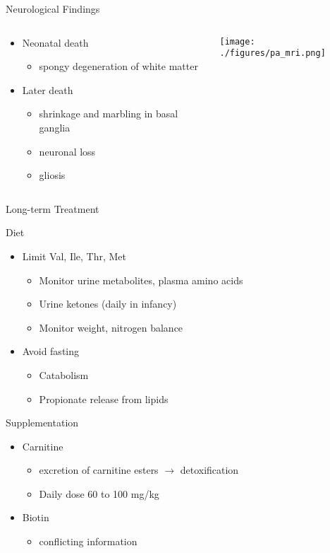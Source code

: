 \documentclass[presentation, smaller]{beamer}
\begin{document}
\begin{frame}[label={sec:orgheadline22}]{Neurological Findings}
\begin{columns}
\begin{column}{.5\columnwidth}
\begin{itemize}
\item Neonatal death
\begin{itemize}
\item spongy degeneration of white matter
\end{itemize}
\item Later death
\begin{itemize}
\item shrinkage and marbling in basal ganglia
\item neuronal loss
\item gliosis
\end{itemize}
\end{itemize}
\end{column}
\begin{column}{.5\columnwidth}
\texttt{[image: ./figures/pa\_mri.png]}
\end{column}
\end{columns}
\end{frame}






\begin{frame}[label={sec:orgheadline23}]{Long-term Treatment}
\begin{block}{Diet}
\begin{itemize}
\item Limit Val, Ile, Thr, Met
\begin{itemize}
\item Monitor urine metabolites, plasma amino acids
\item Urine ketones (daily in infancy)
\item Monitor weight, nitrogen balance
\end{itemize}
\item Avoid fasting
\begin{itemize}
\item Catabolism
\item Propionate release from lipids
\end{itemize}
\end{itemize}
\end{block}

\begin{block}{Supplementation}
\begin{itemize}
\item Carnitine
\begin{itemize}
\item excretion of carnitine esters \(\to\) detoxification
\item Daily dose 60 to 100 mg/kg
\end{itemize}
\item Biotin
\begin{itemize}
\item conflicting information
\end{itemize}
\end{itemize}
\end{block}
\end{frame}
\end{document}

